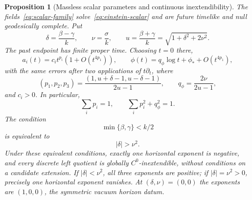 \documentclass[10pt,a4paper]{article}
\numberwithin{equation}{section}
\newtheorem{proposition}[theorem]{Proposition}
\theoremstyle{definition}
\theoremstyle{remark}
\begin{document}
\begin{proposition}[Massless scalar parameters and continuous inextendibility]
\label{prop:einstein-scalar}
\label{prop:scalar-parameter-regions}
The fields~\eqref{eq:scalar-family} solve~\eqref{eq:einstein-scalar}
and are future timelike and null geodesically complete.
Put
\begin{equation}
 \delta=\frac{\beta-\gamma}{k},\qquad
 \nu=\frac{\sigma}{k},\qquad
 u=\frac{\beta+\gamma}{k}=\sqrt{1+\delta^2+2\nu^2}.
 \label{eq:scalar-dimensionless}
\end{equation}
The past endpoint has finite proper time.  Choosing $t=0$ there,
\begin{equation}
 a_i(t)=c_i t^{p_i}(1+O(t^{4p_1})),\qquad
 \phi(t)=q_\phi\log t+\phi_*+O(t^{4p_1}),
 \label{eq:scalar-kasner-asymptotics}
\end{equation}
with the same errors after two applications of $t\partial_t$, where
\begin{equation}
 (p_1,p_2,p_3)
 =\frac{(1,u+\delta-1,u-\delta-1)}{2u-1},\qquad
 q_\phi=\frac{2\nu}{2u-1},
 \label{eq:scalar-kasner-exponents}
\end{equation}
and $c_i>0$.  In particular,
\begin{equation}
 \sum_i p_i=1,\qquad \sum_i p_i^2+q_\phi^2=1.
 \label{eq:scalar-kasner-relations}
\end{equation}
The condition
\begin{equation}
 \min\{\beta,\gamma\}<k/2
 \label{eq:scalar-expanding}
\end{equation}
is equivalent to
\begin{equation}
 |\delta|>\nu^2.
 \label{eq:scalar-parameter-region}
\end{equation}
Under these equivalent conditions, exactly one horizontal exponent is
negative, and every
discrete left quotient is globally $C^0$-inextendible, without
conditions on a candidate extension.  If $|\delta|<\nu^2$, all
three exponents are positive; if $|\delta|=\nu^2>0$, precisely one
horizontal exponent vanishes.  At $(\delta,\nu)=(0,0)$ the
exponents are $(1,0,0)$, the symmetric vacuum horizon datum.
\end{proposition}
\end{document}
